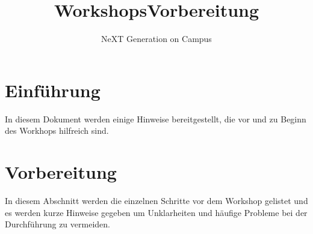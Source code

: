 \documentclass[
	ngerman,
	accentcolor=1c,%
	]{tudapub}
\begin{document}




\title{Workshops\newline Vorbereitung}
\subtitle{NeXT Generation on Campus}
\date{}





\maketitle


\newpage


\tableofcontents

\section{Einf\"uhrung}
In diesem Dokument werden einige Hinweise bereitgestellt, die vor und zu Beginn des Workhops hilfreich sind.

\section{Vorbereitung}
In diesem Abschnitt werden die einzelnen Schritte vor dem Workshop gelistet und es werden kurze Hinweise gegeben um Unklarheiten und h\"aufige Probleme bei der Durchf\"uhrung zu vermeiden.
\end{document}
